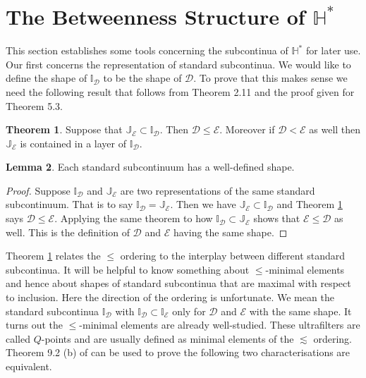 \documentclass[12pt]{article}
\theoremstyle{plain}
\theoremstyle{definition}
\newtheorem{theorem}{Theorem}[section]
\newtheorem{lemma}[theorem]{Lemma}
\newcommand{\II}{\ensuremath{\mathbb I}}
\newcommand{\JJ}{\ensuremath{\mathbb J}}
\newcommand{\HH}{\ensuremath{\mathbb H}}
\newcommand{\0}{\ensuremath{\varnothing}}
\newcommand{\cD}{\ensuremath{\mathcal D}}
\newcommand{\cE}{\ensuremath{\mathcal E}}
\begin{document}
	
	
	

	\section{The Betweenness Structure of $\HH^*$}
	\noindent 
	This section establishes some tools concerning the subcontinua of $\HH^*$ for later use. Our first concerns the representation of standard subcontinua. We would like to define the shape of $\II_\cD$ to be the shape of $\cD$. To prove that this makes sense we need the following result that follows from \cite{CS1} Theorem 2.11 and the proof given for Theorem 5.3.
	
	\begin{theorem} \label{hart} Suppose that $\JJ_\cE \subset \II_\cD$. 
		Then $\cD \le \cE$. Moreover if $\cD < \cE$ as well then $\JJ_\cE$ is contained in a layer of $\II_\cD$.
	\end{theorem}
	
	\begin{lemma}
		Each standard subcontinuum has a well-defined shape.
	\end{lemma}
	
	\begin{proof}
		Suppose $\II_\cD$ and $\JJ_\cE$ are two representations of the same standard subcontinuum. That is to say $\II_\cD=\JJ_\cE$. Then we have $\JJ_\cE \subset \II_\cD$ and Theorem \ref{hart} says $\cD \le \cE$. Applying the same theorem to how $\II_\cD \subset \JJ_\cE$  shows that $\cE \le \cD$ as well. This is the definition of $\cD$ and $\cE$ having the same shape.
	\end{proof}
	
	Theorem \ref{hart} relates the $\le$ ordering to the interplay between different standard subcontinua.
	It will be helpful to know something about $\le$-minimal elements and hence about shapes of standard subcontinua that are maximal with respect to inclusion. Here the direction of the ordering is unfortunate. We mean the standard subcontinua $\II_\cD$ with $\II_\cD \subset \II_\cE$ only for $\cD$ and $\cE$ with the same shape. 
	It turns out the $\le$-minimal elements are already well-studied. 
	These ultrafilters are called $Q$-points and are usually defined as minimal elements of the $\lesssim$ ordering.
	Theorem 9.2 (b) of \cite{uff} can be used to prove the following two characterisations are equivalent.
	
\end{document}
